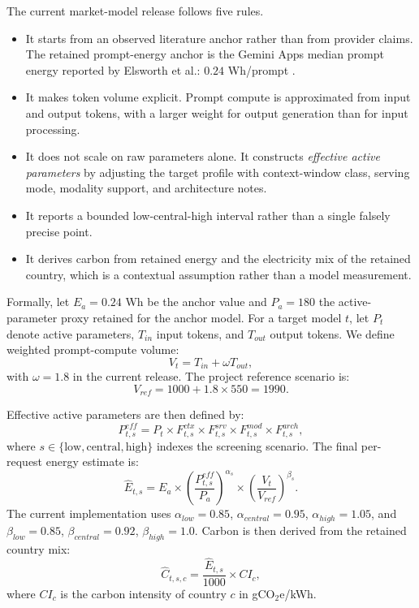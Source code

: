 \documentclass[10pt,a4paper]{article}
\begin{document}
The current market-model release follows five rules.
\begin{itemize}
\item It starts from an observed literature anchor rather than from provider claims. The retained prompt-energy anchor is the Gemini Apps median prompt energy reported by Elsworth et al.: $0.24$ Wh/prompt \cite{elsworth2025}.
\item It makes token volume explicit. Prompt compute is approximated from input and output tokens, with a larger weight for output generation than for input processing.
\item It does not scale on raw parameters alone. It constructs \emph{effective active parameters} by adjusting the target profile with context-window class, serving mode, modality support, and architecture notes.
\item It reports a bounded low-central-high interval rather than a single falsely precise point.
\item It derives carbon from retained energy and the electricity mix of the retained country, which is a contextual assumption rather than a model measurement.
\end{itemize}

Formally, let $E_a = 0.24$ Wh be the anchor value and $P_a = 180$ the active-parameter proxy retained for the anchor model. For a target model $t$, let $P_t$ denote active parameters, $T_{in}$ input tokens, and $T_{out}$ output tokens. We define weighted prompt-compute volume:
\begin{equation}
V_t = T_{in} + \omega T_{out},
\end{equation}
with $\omega = 1.8$ in the current release. The project reference scenario is:
\begin{equation}
V_{ref} = 1000 + 1.8 \times 550 = 1990.
\end{equation}

Effective active parameters are then defined by:
\begin{equation}
P^{eff}_{t,s} = P_t \times F^{ctx}_{t,s} \times F^{srv}_{t,s} \times F^{mod}_{t,s} \times F^{arch}_{t,s},
\end{equation}
where $s \in \{\mathrm{low}, \mathrm{central}, \mathrm{high}\}$ indexes the screening scenario. The final per-request energy estimate is:
\begin{equation}
\hat{E}_{t,s} = E_a \times \left(\frac{P^{eff}_{t,s}}{P_a}\right)^{\alpha_s}
\times \left(\frac{V_t}{V_{ref}}\right)^{\beta_s}.
\end{equation}
The current implementation uses $\alpha_{low}=0.85$, $\alpha_{central}=0.95$, $\alpha_{high}=1.05$, and $\beta_{low}=0.85$, $\beta_{central}=0.92$, $\beta_{high}=1.0$. Carbon is then derived from the retained country mix:
\begin{equation}
\hat{C}_{t,s,c} = \frac{\hat{E}_{t,s}}{1000} \times CI_c,
\end{equation}
where $CI_c$ is the carbon intensity of country $c$ in gCO$_2$e/kWh.
\end{document}
